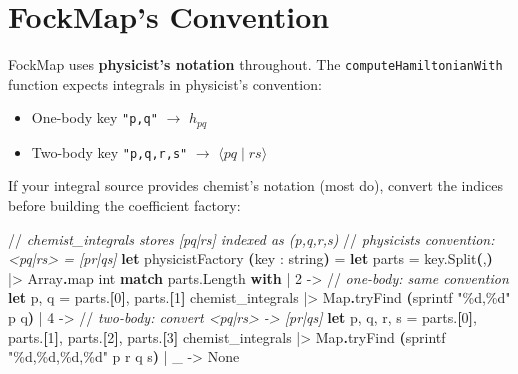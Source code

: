 \documentclass[
  11pt,
  oneside]{book}
\newenvironment{Shaded}{\begin{snugshade}}{\end{snugshade}}
\newcommand{\CharTok}[1]{\textcolor[rgb]{0.31,0.60,0.02}{#1}}
\newcommand{\CommentTok}[1]{\textcolor[rgb]{0.56,0.35,0.01}{\textit{#1}}}
\newcommand{\DataTypeTok}[1]{\textcolor[rgb]{0.13,0.29,0.53}{#1}}
\newcommand{\DecValTok}[1]{\textcolor[rgb]{0.00,0.00,0.81}{#1}}
\newcommand{\KeywordTok}[1]{\textcolor[rgb]{0.13,0.29,0.53}{\textbf{#1}}}
\newcommand{\NormalTok}[1]{#1}
\newcommand{\OperatorTok}[1]{\textcolor[rgb]{0.81,0.36,0.00}{\textbf{#1}}}
\newcommand{\StringTok}[1]{\textcolor[rgb]{0.31,0.60,0.02}{#1}}
\providecommand{\tightlist}{%
  \setlength{\itemsep}{0pt}\setlength{\parskip}{0pt}}
\begin{document}
\section{FockMap's Convention}\label{fockmaps-convention}

FockMap uses \textbf{physicist's notation} throughout. The
\texttt{computeHamiltonianWith} function expects integrals in
physicist's convention:

\begin{itemize}
\tightlist
\item
  One-body key \texttt{"p,q"} $\rightarrow$ \(h_{pq}\)
\item
  Two-body key \texttt{"p,q,r,s"} $\rightarrow$ \(\langle pq \mid rs\rangle\)
\end{itemize}

If your integral source provides chemist's notation (most do), convert
the indices before building the coefficient factory:

\begin{Shaded}
\begin{Highlighting}[]
\NormalTok{//}\CommentTok{ chemist\_integrals stores [pq|rs] indexed as (p,q,r,s)}
\NormalTok{//}\CommentTok{ physicist\textquotesingle{}s convention: <pq|rs> = [pr|qs]}
\KeywordTok{let}\NormalTok{ physicistFactory }\OperatorTok{(}\NormalTok{key : }\DataTypeTok{string}\OperatorTok{)}\NormalTok{ =}
    \KeywordTok{let}\NormalTok{ parts = key.Split}\OperatorTok{(}\CharTok{\textquotesingle{},\textquotesingle{}}\OperatorTok{)}\NormalTok{ |\textgreater{} Array}\KeywordTok{.}\NormalTok{map }\DataTypeTok{int}
    \KeywordTok{match}\NormalTok{ parts.Length }\KeywordTok{with}
\NormalTok{    | }\DecValTok{2}\NormalTok{ {-}\textgreater{} //}\CommentTok{ one{-}body: same convention}
        \KeywordTok{let}\NormalTok{ p, q = parts.}\OperatorTok{[}\DecValTok{0}\OperatorTok{]}\NormalTok{, parts.}\OperatorTok{[}\DecValTok{1}\OperatorTok{]}
\NormalTok{        chemist\_integrals |\textgreater{} Map}\KeywordTok{.}\NormalTok{tryFind }\OperatorTok{(}\NormalTok{sprintf }\StringTok{"\%d,\%d"}\NormalTok{ p q}\OperatorTok{)}
\NormalTok{    | }\DecValTok{4}\NormalTok{ {-}\textgreater{} //}\CommentTok{ two{-}body: convert <pq|rs> -> [pr|qs]}
        \KeywordTok{let}\NormalTok{ p, q, r, s = parts.}\OperatorTok{[}\DecValTok{0}\OperatorTok{]}\NormalTok{, parts.}\OperatorTok{[}\DecValTok{1}\OperatorTok{]}\NormalTok{, parts.}\OperatorTok{[}\DecValTok{2}\OperatorTok{]}\NormalTok{, parts.}\OperatorTok{[}\DecValTok{3}\OperatorTok{]}
\NormalTok{        chemist\_integrals |\textgreater{} Map}\KeywordTok{.}\NormalTok{tryFind }\OperatorTok{(}\NormalTok{sprintf }\StringTok{"\%d,\%d,\%d,\%d"}\NormalTok{ p r q s}\OperatorTok{)}
\NormalTok{    | \_ {-}\textgreater{} None}
\end{Highlighting}
\end{Shaded}
\end{document}
